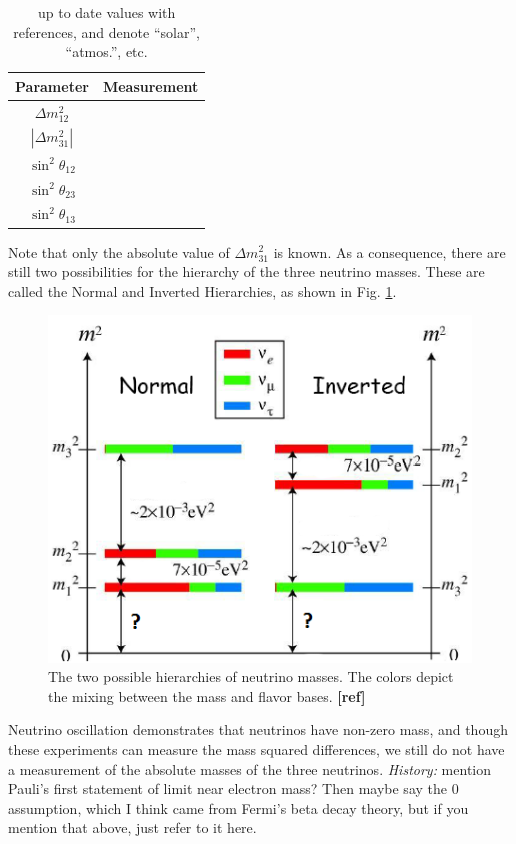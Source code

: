 \begin{table}[!htbp]
\caption{up to date values with references, and denote ``solar'', ``atmos.'', etc.} %
\label{table:nu_osc_vals}
\begin{tabular}{c|c}
Parameter & Measurement \\
\hline
$\Delta m_{12}^{2}$ & \\
$|\Delta m_{31}^{2}|$ & \\
$\sin^{2} \theta_{12}$ & \\
$\sin^{2} \theta_{23}$ & \\
$\sin^{2} \theta_{13}$ & \\
\end{tabular}
\end{table}

Note that only the absolute value of $\Delta m_{31}^{2}$ is known.  As a consequence, there are still two possibilities for the hierarchy of the three neutrino masses.  These are called the Normal and Inverted Hierarchies, as shown in Fig. \ref{fig:numasshier}.

\begin{figure}[H]
        \centering
                \includegraphics[width=.5\textwidth]{figures/hierarchy_alterred.png}
                \caption{The two possible hierarchies of neutrino masses.  The colors depict the mixing between the mass and flavor bases. {\color{red}\textbf{[ref]}}}
\label{fig:numasshier}
\end{figure}

Neutrino oscillation demonstrates that neutrinos have non-zero mass, and though these experiments can measure the mass squared differences, we still do not have a measurement of the absolute masses of the three neutrinos.  {\color{gray}\emph{History:  }mention Pauli's first statement of limit near electron mass?  Then maybe say the 0 assumption, which I think came from Fermi's beta decay theory, but if you mention that above, just refer to it here.}

